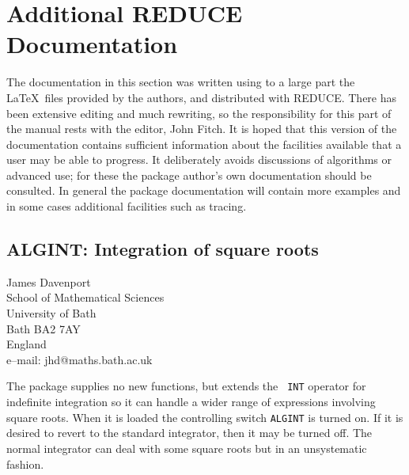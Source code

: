 \documentclass[11pt,letterpaper]{book}
\makeatletter
\newcommand{\REDUCE}{REDUCE}
\newcommand{\underscore}{\_}
\newcommand{\ttindex}[1]{{\renewcommand{\_}{\protect\underscore}%
                          \index{#1@{\tt #1}}}}
\makeatother
\begin{document}
\renewcommand{\k}[1] {{\bf #1}}

\newcommand{\f}[1] {{\tt #1}}

\newcommand{\example}{\refstepcounter{examplectr}
\noindent{\bf Example \theexamplectr}}

\part{Additional {\REDUCE} Documentation}
\setcounter{examplectr}{0}

The documentation in this section was written using to a large part
the \LaTeX\ files provided by the authors, and distributed with
\REDUCE.  There has been extensive editing and much rewriting, so
the responsibility for this part of the manual rests with the editor,
John Fitch.  It is hoped that this version of the documentation
contains sufficient information about the facilities available that a
user may be able to progress.  It deliberately avoids discussions of
algorithms or advanced use; for these the package author's own
documentation should be consulted.  In general the package
documentation will contain more examples and in some cases additional
facilities such as tracing.

\chapter{ALGINT: Integration of square roots}
\label{ALGINT}

{\footnotesize
\begin{center}
James Davenport \\
School of Mathematical Sciences \\
University of Bath \\
Bath BA2 7AY \\
England \\[0.05in]
e--mail: jhd@maths.bath.ac.uk
\end{center}
}

The package supplies no new functions, but extends the {\tt
INT}\ttindex{INT} operator for indefinite integration so it can handle
a wider range of expressions involving square roots.  When it is
loaded the controlling switch {\tt ALGINT}\ttindex{ALGINT} is turned
on.  If it is desired to revert to the standard integrator, then it
may be turned off.  The normal integrator can deal with some square
roots but in an unsystematic fashion.
\end{document}
